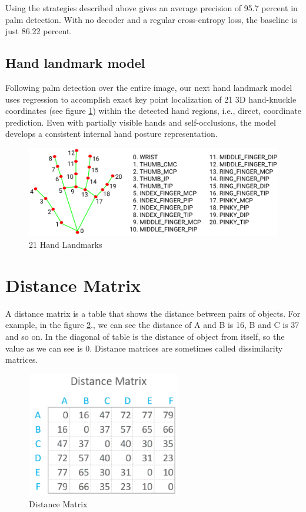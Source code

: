         Using the strategies described above gives an average precision of 95.7 percent in palm detection. With no decoder and a regular cross-entropy loss, the baseline is just 86.22 percent.

      \subsection{ Hand landmark model }
        Following palm detection over the entire image, our next hand landmark model uses regression to accomplish exact key point localization of 21 3D hand-knuckle coordinates (see figure \ref{fig:Chap3-HandLandMark}) within the detected hand regions, i.e., direct, coordinate prediction. Even with partially visible hands and self-occlusions, the model develops a consistent internal hand posture representation.
        \begin{figure}[H]
          \centering
          \includegraphics[width=\textwidth]{img/Chap3/HandLandMark}
          \caption{ 21 Hand Landmarks }
          \label{fig:Chap3-HandLandMark}
        \end{figure}


  \section{ Distance Matrix }
    A distance matrix is a table that shows the distance between pairs of objects.
    For example, in the figure \ref{fig:Chap3-DM}., we can see the distance of A and B is 16, B and C is 37
    and so on. In the diagonal of table is the distance of object from itself, so the value
    as we can see is 0. Distance matrices are sometimes called dissimilarity matrices.

    \begin{figure}[H]
      \centering
      \includegraphics[width=0.6\textwidth]{img/Chap3/DM}
      \caption{ Distance Matrix }
      \label{fig:Chap3-DM}
    \end{figure}

